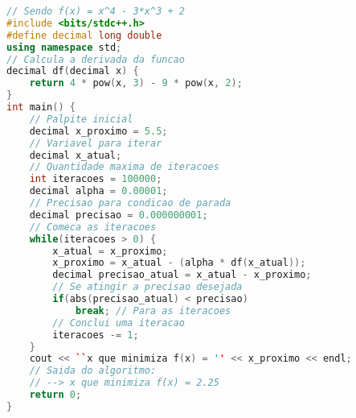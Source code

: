 \begin{lstlisting}[language=C++]
// Sendo f(x) = x^4 - 3*x^3 + 2
#include <bits/stdc++.h>
#define decimal long double
using namespace std;
// Calcula a derivada da funcao
decimal df(decimal x) {
	return 4 * pow(x, 3) - 9 * pow(x, 2);
}
int main() {
	// Palpite inicial
	decimal x_proximo = 5.5;
	// Variavel para iterar
	decimal x_atual;
	// Quantidade maxima de iteracoes
	int iteracoes = 100000;
	decimal alpha = 0.00001;
	// Precisao para condicao de parada
	decimal precisao = 0.000000001;
	// Comeca as iteracoes
	while(iteracoes > 0) {
		x_atual = x_proximo;
		x_proximo = x_atual - (alpha * df(x_atual));
		decimal precisao_atual = x_atual - x_proximo;
		// Se atingir a precisao desejada
		if(abs(precisao_atual) < precisao)
			break; // Para as iteracoes
		// Conclui uma iteracao
		iteracoes -= 1;
	}
	cout << ``x que minimiza f(x) = '' << x_proximo << endl;
	// Saida do algoritmo:
	// --> x que minimiza f(x) = 2.25
	return 0;
}
\end{lstlisting}
